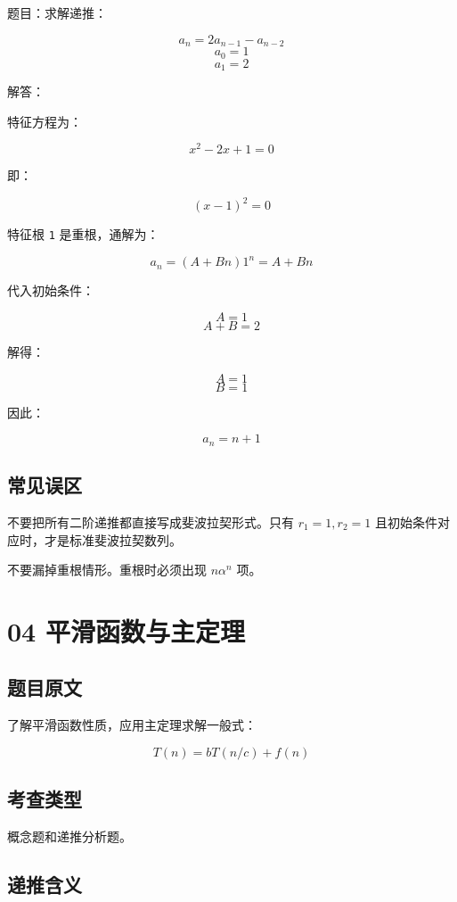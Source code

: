 \documentclass[UTF8,zihao=-4]{ctexart}
\begin{document}
题目：求解递推：

\[a_{n} = 2a_{n-1} - a_{n-2}\]
\[a_{0} = 1\]
\[a_{1} = 2\]

解答：

特征方程为：

\[x^{2} - 2x + 1 = 0\]

即：

\[(x - 1)^{2} = 0\]

特征根 \texttt{1} 是重根，通解为：

\[a_{n} = (A + Bn)1^{n} = A + Bn\]

代入初始条件：

\[A = 1\]
\[A + B = 2\]

解得：

\[A = 1\]
\[B = 1\]

因此：

\[a_{n} = n + 1\]

\subsection*{常见误区}

不要把所有二阶递推都直接写成斐波拉契形式。只有 $r_1 = 1, r_2 = 1$ 且初始条件对应时，才是标准斐波拉契数列。

不要漏掉重根情形。重根时必须出现 $n \alpha^n$ 项。

\newpage

\section*{04 平滑函数与主定理}

\subsection*{题目原文}

了解平滑函数性质，应用主定理求解一般式：

\[T(n) = bT(n/c) + f(n)\]

\subsection*{考查类型}

概念题和递推分析题。

\subsection*{递推含义}
\end{document}
